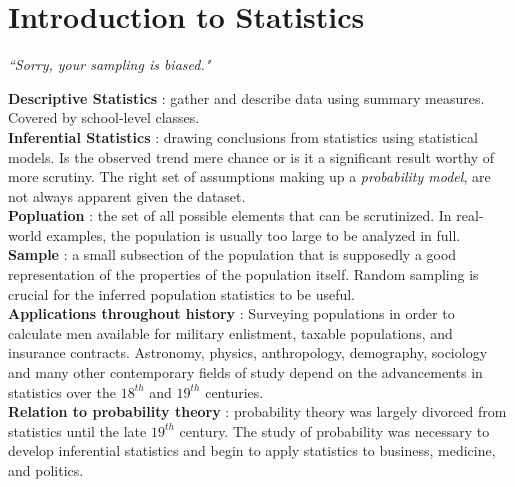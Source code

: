 \chapter{Introduction to Statistics}

\begin{flushright}
	\textit{``Sorry, your sampling is biased."} \\
\end{flushright}

\textbf{Descriptive Statistics} : gather and describe data using summary measures. Covered by school-level classes. \\

\textbf{Inferential Statistics} : drawing conclusions from statistics using statistical models. Is the observed trend mere chance or is it a significant result worthy of more scrutiny. The right set of assumptions making up a \textit{probability model}, are not always apparent given the dataset. \\

\textbf{Popluation} : the set of all possible elements that can be scrutinized. In real-world examples, the population is usually too large to be analyzed in full. \\

\textbf{Sample} : a small subsection of the population that is supposedly a good representation of the properties of the population itself. Random sampling is crucial for the inferred population statistics to be useful. \\

\textbf{Applications throughout history} : Surveying populations in order to calculate men available for military enlistment, taxable populations, and insurance contracts. Astronomy, physics, anthropology, demography, sociology and many other contemporary fields of study depend on the advancements in statistics over the $ 18^{th} $ and $19^{th}$ centuries. \\

\textbf{Relation to probability theory} : probability theory was largely divorced from statistics until the late $ 19^{th} $ century. The study of probability was necessary to develop inferential statistics and begin to apply statistics to business, medicine, and politics. \\

\newpage

